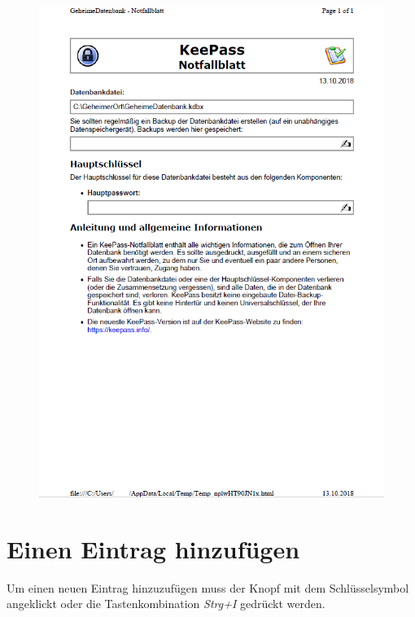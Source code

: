 \documentclass[12pt,a4paper]{scrreprt}
\begin{document}
\begin{figure}[h]
\begin{center}
\includegraphics[width=350pt]{media/knewdb6.png}
\label{knewdb6}
\end{center}
\end{figure}

\newpage

\section{Einen Eintrag hinzufügen}
Um einen neuen Eintrag hinzuzufügen muss der Knopf mit dem Schlüsselsymbol angeklickt oder die Tastenkombination \textit{Strg+I} gedrückt werden.
\end{document}
